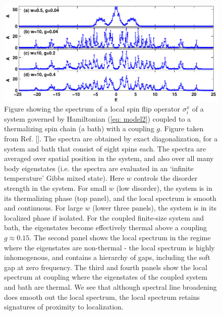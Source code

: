 \documentclass[amsmath,onecolumn, superscriptaddress,preprint,aps]{revtex4}
\renewcommand{\cite}[1]{[\onlinecite{#1}]}
\begin{document}
\begin{figure}
\includegraphics{numericalspectra}
\caption{\label{fig: spectrum} Figure showing the spectrum of a local spin flip operator $\sigma^x_i$ of a system governed by Hamiltonian (\ref{eq: model2}) coupled to a thermalizing spin chain (a bath) with a coupling $g$.  Figure taken from Ref. \cite{spectralnumerics}.  The spectra are obtained by exact diagonalization, for a system and bath that consist of eight spins each.  The spectra are averaged over spatial position in the system, and also over all many body eigenstates (i.e. the spectra are evaluated in an `infinite temperature' Gibbs mixed state).  Here $w$ controls the disorder strength in the system.  For small $w$ (low disorder), the system is in its thermalizing phase (top panel), and the local spectrum is smooth and continuous.  For large $w$ (lower three panels), the system is in its localized phase if isolated.  For the coupled finite-size system and bath, the eigenstates become effectively thermal above a coupling $g \approx 0.15$.  The second panel shows the local spectrum in the regime where the eigenstates are non-thermal - the local spectrum is highly inhomogenous, and contains a hierarchy of gaps, including the soft gap at zero frequency.  The third and fourth panels show the local spectrum at coupling where the eigenstates of the coupled system and bath are thermal.  We see that although spectral line broadening does smooth out the local spectrum, the local spectrum retains signatures of proximity to localization.}
\end{figure}
\end{document}
